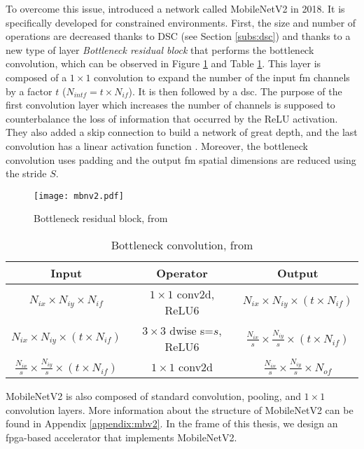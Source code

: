 To overcome this issue, \textcite{sandler_mobilenetv2_2018} introduced a network called MobileNetV2 in 2018. It is specifically developed for constrained environments. First, the size and number of operations are decreased thanks to DSC (see Section \ref{subs:dsc}) and thanks to a new type of layer \textit{Bottleneck residual block} that performs the bottleneck convolution, which can be observed in Figure \ref{fig:invreslinbot} and Table \ref{tab:invreslinbot}.
This layer is composed of a $1 \times 1$ convolution to expand the number of the input \acrshort{fm} channels by a factor $t$ ($N_{intf} = t \times N_{if}$). It is then followed by a \acrshort{dsc}. The purpose of the first convolution layer which increases the number of channels is supposed to counterbalance the loss of information that occurred by the ReLU activation. They also added a skip connection to build a network of great depth, and the last convolution has a linear activation function \cite{sandler_mobilenetv2_2018}. Moreover, the bottleneck convolution uses padding and the output \acrshort{fm} spatial dimensions are reduced using the stride $S$.

%
\begin{figure}[H]
    \centering
    \texttt{[image: mbnv2.pdf]}
    \caption{Bottleneck residual block, from \cite{sandler_mobilenetv2_2018}}
    \label{fig:invreslinbot}
\end{figure}

\begin{table}
    \center
    \begin{tabular}{c|c|c}
        Input & Operator & Output \\
        \hline \hline
        $N_{ix} \times N_{iy} \times N_{if}$ & $1 \times 1$ conv2d, ReLU6 & $N_{ix} \times N_{iy} \times (t \times N_{if})$ \\
        $N_{ix} \times N_{iy} \times (t \times N_{if})$ & $3 \times3$ dwise s=$s$, ReLU6 & $\frac{N_{ix}}{s} \times \frac{N_{iy}}{s} \times (t \times N_{if})$ \\
        $\frac{N_{ix}}{s} \times \frac{N_{iy}}{s} \times (t \times N_{if})$ & $1 \times 1$ conv2d & $\frac{N_{ix}}{s} \times \frac{N_{iy}}{s} \times N_{of}$ \\
        \hline \hline
    \end{tabular}
    \caption{Bottleneck convolution, from \cite{sandler_mobilenetv2_2018}}
    \label{tab:invreslinbot}
\end{table}

MobileNetV2 is also composed of standard convolution, pooling, and $1 \times 1$ convolution layers. More information about the structure of MobileNetV2 can be found in Appendix \ref{appendix:mbv2}. In the frame of this thesis, we design an \acrshort{fpga}-based accelerator that implements MobileNetV2.
